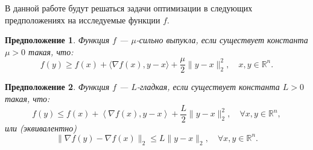 \documentclass{article}
\newcommand{\R}{\mathbb{R}}
\newtheorem{proposition}{Предположение}
\begin{document}
\begin{comment}
    В таблице 1 приведены некоторые обозначения, используемые в работе 

\begin{table}[h!]\label{def_table}
\caption{Список обозначений, используемых в работе}
\centering
 \begin{tabular}{||p{2 cm} | p{8cm}||} 
 \hline

 $\mathcal{F}_{\mu, L}$ & Класс $\mu$-сильно выпуклых $L$-гладких функций  \\ 
 \hline
 \langle x,y \rangle & Скалярное произведение векторов $x,y \in \R^n$  \\
 \hline
 $\|x\|_2$ & $\ell_2$-норма элемента $x \in \R^n$  \\
 \hline
 $x_0$ & Начальная точка  \\
 \hline
 $k$ & Номер текущей итерации алгоритма  \\
 \hline
 $N$ & Полное число итераций алгоритма \\
 \hline
 $\mathcal{O}^{(f)}$ & Ответ оракула  \\ 
 \hline
 $\mathcal{A}$ & Алгоритм (правило генерации последовательностей $(x_k)_{k \le N}$ приближений точки минимума $x_{\star}$ функции $f$) \\
 \hline
 $(x_k)_{k \le N}$ & Последовательность точек  \\[1ex] 
 \hline
 \end{tabular}
\end{table}
\end{comment}




В данной работе будут решаться задачи оптимизации в следующих предположениях на исследуемые функции $f$.

\begin{proposition}
    Функция $f$ --- $\mu$-сильно выпукла, если существует константа $\mu > 0$ такая, что:
    \begin{equation}\label{eq:str_cvx}
        f(y) \geq f(x) + \langle \nabla f(x), y - x \rangle + \frac{\mu}{2}\|y - x\|_2^2, \quad x, y \in \R^n. 
    \end{equation}
\end{proposition}


\begin{proposition}
    Функция $f$ --- $L$-гладкая, если существует константа $L > 0$ такая, что:
\begin{equation}\label{smoothness_cond}
    f(y) \leq f(x)+ \left\langle\nabla f(x), y-x\right\rangle + \frac{L}{2} \|y-x\|_2^2, \quad \forall x, y \in \mathbb{R}^n,
\end{equation}
или (эквивалентно) 
\begin{equation}\label{eq_6}
    \|\nabla f(y) - \nabla f(x)\|_2 \leq L \|y - x\|_2, \quad \forall x, y \in \mathbb{R}^n.
\end{equation}
\end{proposition}
\end{document}
